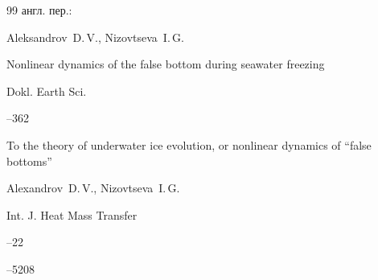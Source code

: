 \begin{thebibliography}{99}
\transl англ. пер.:~

\by Aleksandrov~D.\,V., Nizovtseva~I.\,G.

\paper Nonlinear dynamics of the false bottom during seawater freezing

\jour  Dokl. Earth Sci.



--362 





\paper To the theory of underwater ice evolution, or nonlinear dynamics of ``false bottoms''

\by Alexandrov~D.\,V., Nizovtseva~I.\,G.

\jour Int. J. Heat Mass Transfer



--22

--5208





\end{thebibliography}





\noindent

\hskip6.5cm \thedate \par\noindent

\hskip6.5cm\therevdate



\makeengtitle







 \newpage

%



%

